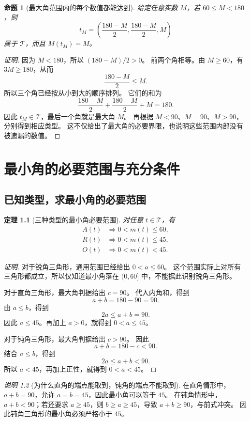 \documentclass[UTF8,a4paper,zihao=-4,oneside,openany,fontset=fandol]{ctexbook}
\newtheorem{theorem}{定理}[chapter]
\newtheorem{proposition}[theorem]{命题}
\theoremstyle{definition}
\theoremstyle{remark}
\newtheorem{remark}[theorem]{说明}
\begin{document}
\begin{proposition}[最大角范围内的每个数值都能达到]
给定任意实数 $M$，若 $60\le M<180$，则
\[
t_M=\left(\frac{180-M}{2},\frac{180-M}{2},M\right)
\]
属于 $\mathcal T$，而且 $M(t_M)=M$。
\end{proposition}

\begin{proof}[证明]
因为 $M<180$，所以 $(180-M)/2>0$。
前两个角相等。由 $M\ge60$，有 $3M\ge180$，从而
\[
\frac{180-M}{2}\le M.
\]
所以三个角已经按从小到大的顺序排列。
它们的和为
\[
\frac{180-M}{2}+\frac{180-M}{2}+M=180.
\]
因此 $t_M\in\mathcal T$，最后一个角就是最大角 $M$。
再根据 $M<90$、$M=90$、$M>90$，分别得到相应类型。
这不仅给出了最大角的必要界限，也说明这些范围内部没有被遗漏的数值。
\end{proof}

\chapter{最小角的必要范围与充分条件}
\label{math:minimum}

\section{已知类型，求最小角的必要范围}

\begin{theorem}[三种类型的最小角必要范围]
对任意 $t\in\mathcal T$，有
\[
\begin{aligned}
A(t)&\Longrightarrow0<m(t)\le60,\\
R(t)&\Longrightarrow0<m(t)\le45,\\
O(t)&\Longrightarrow0<m(t)<45.
\end{aligned}
\]
\end{theorem}

\begin{proof}[证明]
对于锐角三角形，通用范围已经给出 $0<a\le60$。
这个范围实际上对所有三角形都成立，所以仅知道最小角落在 $(0,60]$ 中，不能据此识别锐角三角形。

对于直角三角形，最大角判据给出 $c=90$。
代入内角和，得到
\[
a+b=180-90=90.
\]
由 $a\le b$，得到
\[
2a\le a+b=90.
\]
因此 $a\le45$。再加上 $a>0$，就得到 $0<a\le45$。

对于钝角三角形，最大角判据给出 $c>90$。
因此
\[
a+b=180-c<90.
\]
结合 $a\le b$，得到
\[
2a\le a+b<90.
\]
所以 $a<45$，再加上正性，就得到 $0<a<45$。
\end{proof}

\begin{remark}[为什么直角的端点能取到，钝角的端点不能取到]
在直角情形中，$a+b=90$，允许 $a=b=45$，因此最小角可以等于 $45$。
在钝角情形中，$a+b<90$；若还要求 $a\ge45$，则 $b\ge a\ge45$，导致 $a+b\ge90$，与前式冲突。
因此钝角三角形的最小角必须严格小于 $45$。
\end{remark}
\end{document}
